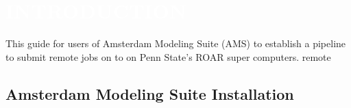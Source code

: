 \section{\textcolor{white}{INTRODUCTION}}

This guide for users of Amsterdam Modeling Suite (AMS) to establish a pipeline to submit remote jobs on to on Penn State's ROAR super computers. remote 
\subsection{Amsterdam Modeling Suite Installation}